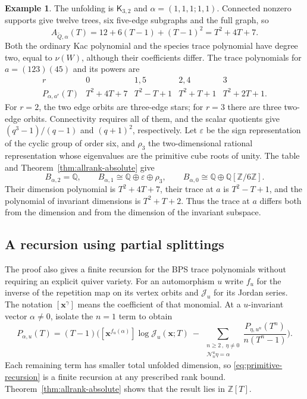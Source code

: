 \documentclass[11pt, reqno]{amsart}
\numberwithin{equation}{section}
\theoremstyle{definition}
\newtheorem{example}[theorem]{Example}
\theoremstyle{remark}
\newcommand{\mb}[1]{\mathbb{#1}}
\newcommand{\mc}[1]{\mathcal{#1}}
\newcommand{\Qbar}{\widetilde Q}
\newcommand{\iso}{\cong}
\begin{document}
\begin{example}
The unfolding is $\mathsf K_{3,2}$ and $\alpha=(1,1,1;1,1)$. Connected
nonzero supports give twelve trees, six five-edge subgraphs and the
full graph, so
\[ A_{\Qbar,\alpha}(T)=12+6(T-1)+(T-1)^2=T^2+4T+7. \]
Both the ordinary Kac polynomial and the species trace polynomial
have degree two, equal to $\nu(W)$, although their coefficients differ.
The trace polynomials for $a=(123)(45)$ and its powers are
\[
\begin{array}{c|cccc}
 r&0&1,5&2,4&3\\\hline
 P_{\alpha,a^r}(T)&T^2+4T+7&T^2-T+1&T^2+T+1&T^2+2T+1.
\end{array}
\]
For $r=2$, the two edge orbits are three-edge stars; for $r=3$ there
are three two-edge orbits. Connectivity requires all of them, and
the scalar quotients give $(q^3-1)/(q-1)$ and $(q+1)^2$, respectively.
Let $\varepsilon$ be the sign representation of the cyclic group of
order six, and $\rho_3$ the two-dimensional rational representation whose eigenvalues
are the primitive cube roots of unity. The table and Theorem~\ref{thm:allrank-absolute} give
\[ B_{\alpha,2}=\mb Q,\qquad B_{\alpha,1}\iso\mb Q\oplus\varepsilon\oplus\rho_3,\qquad B_{\alpha,0}\iso\mb Q\oplus\mb Q[\mb Z/6\mb Z]. \]
Their dimension polynomial is $T^2+4T+7$, their trace at $a$ is
$T^2-T+1$, and the polynomial of invariant dimensions is $T^2+T+2$.
Thus the trace at $a$ differs both from the dimension and from the
dimension of the invariant subspace.
\end{example}


\subsection{A recursion using partial splittings}

The proof also gives a finite recursion for the BPS trace polynomials
without requiring an explicit quiver variety. For an automorphism $u$ write
$f_u$ for the inverse of the repetition map on its vertex orbits and
$\mc J_u$ for its Jordan series. The notation $[\mathbf x^\gamma]$
means the coefficient of that monomial. At a $u$-invariant vector
$\alpha\ne0$, isolate the $n=1$ term to obtain
\begin{equation}        \label{eq:primitive-recursion}
 P_{\alpha,u}(T)=(T-1)\Bigg([\mathbf x^{f_u(\alpha)}] \log\mc J_u(\mathbf x;T)\
 -\ \sum_{\substack{n\geq2\,,\ \eta\ne0\\
                         \mc N_n^u\eta=\alpha}}
       \frac{P_{\eta,u^n}(T^n)}{n(T^n-1)}\Bigg).
\end{equation}
Each remaining term has smaller total unfolded dimension, so
\eqref{eq:primitive-recursion} is a finite recursion at any prescribed
rank bound. Theorem~\ref{thm:allrank-absolute} shows that the result
lies in $\mb Z[T]$.
\end{document}
